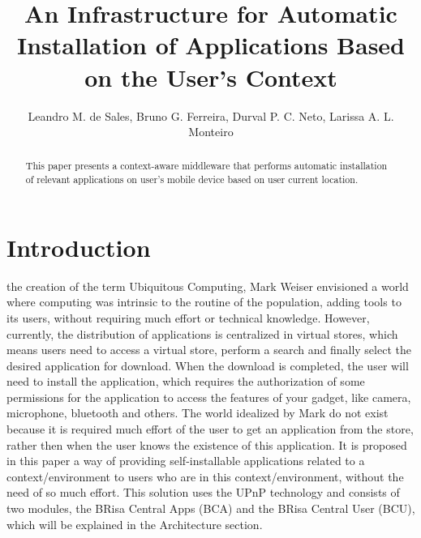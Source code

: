 \documentclass[journal]{IEEEtran}
\begin{document}
\title{An Infrastructure for Automatic Installation of Applications Based on the User's Context}

\author{
        Leandro M. de Sales,
        Bruno G. Ferreira,
        Durval P. C. Neto,
        Larissa A. L. Monteiro
}

\maketitle

\begin{abstract}
This paper presents a context-aware middleware that performs automatic installation of relevant applications on user’s mobile device based on user current location.
\end{abstract}

\IEEEpeerreviewmaketitle



\section{Introduction}

 the creation of the term Ubiquitous Computing, Mark Weiser envisioned a world where computing was intrinsic to the routine of the population, adding tools to its users, without requiring much effort or technical knowledge.  However, currently, the distribution of applications is centralized in virtual stores, which means users need to access a virtual store, perform a search and finally select the desired application for download. When the download is completed, the user will need to install the application, which requires the authorization of some permissions for the application to access the features of your gadget, like camera, microphone, bluetooth and others. The world idealized by Mark do not exist because it is required much effort of the user to get an application from the store, rather then when the user knows the existence of this application. It is proposed in this paper a way of providing self-installable applications related to a context/environment to users who are in this context/environment, without the need of so much effort. This solution uses the UPnP technology and consists of two modules, the BRisa Central Apps (BCA) and the BRisa Central User (BCU), which will be explained in the Architecture section.
\end{document}
